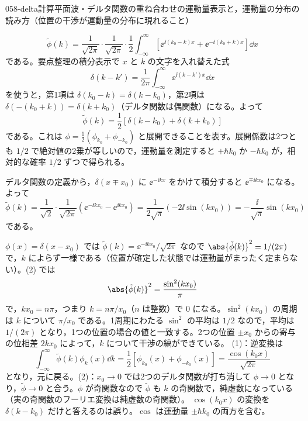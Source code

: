 \documentclass[uplatex,dvipdfmx,a4paper,11pt]{jsarticle}
\begin{document}
\begin{mondai}{058-delta}{計算}{平面波・デルタ関数の重ね合わせの運動量表示と，運動量の分布の読み方（位置の干渉が運動量の分布に現れること）}
\begin{tadashii}
\[ \tilde{\phi}(k)=\frac{1}{\sqrt{2\pi}}\cdot\frac{1}{\sqrt{2\pi}}\cdot\frac{1}{2}\int_{-\infty}^{\infty}\left[\ee^{\ii(k_{0}-k)x}+\ee^{-\ii(k_{0}+k)x}\right]\dd x \]
である。要点整理の積分表示で $x$ と $k$ の文字を入れ替えた式
\[ \delta(k-k')=\frac{1}{2\pi}\int_{-\infty}^{\infty}\ee^{\ii(k-k')x}\dd x \]
を使うと，第1項は $\delta(k_{0}-k)=\delta(k-k_{0})$，第2項は $\delta(-(k_{0}+k))=\delta(k+k_{0})$（デルタ関数は偶関数）になる。よって
\[ \tilde{\phi}(k)=\frac{1}{2}\left[\delta(k-k_{0})+\delta(k+k_{0})\right] \]
である。これは $\phi=\frac{1}{2}(\phi_{k_{0}}+\phi_{-k_{0}})$ と展開できることを表す。展開係数は2つとも $1/2$ で絶対値の2乗が等しいので，運動量を測定すると $+\hbar k_{0}$ か $-\hbar k_{0}$ が，相対的な確率 $1/2$ ずつで得られる。

 デルタ関数の定義から，$\delta(x\mp x_{0})$ に $\ee^{-\ii kx}$ をかけて積分すると $\ee^{\mp\ii kx_{0}}$ になる。よって
\[ \tilde{\phi}(k)=\frac{1}{\sqrt{2}}\cdot\frac{1}{\sqrt{2\pi}}\left(\ee^{-\ii kx_{0}}-\ee^{\ii kx_{0}}\right)=\frac{1}{2\sqrt{\pi}}\left(-2\ii\sin(kx_{0})\right)=-\frac{\ii}{\sqrt{\pi}}\sin(kx_{0}) \]
である。

 $\phi(x)=\delta(x-x_{0})$ では $\tilde{\phi}(k)=\ee^{-\ii kx_{0}}/\sqrt{2\pi}$ なので $\abs{\tilde{\phi}(k)}^{2}=1/(2\pi)$ で，$k$ によらず一様である（位置が確定した状態では運動量がまったく定まらない）。(2) では
\[ \abs{\tilde{\phi}(k)}^{2}=\frac{\sin^{2}(kx_{0})}{\pi} \]
で，$kx_{0}=n\pi$，つまり $k=n\pi/x_{0}$（$n$ は整数）で $0$ になる。$\sin^{2}(kx_{0})$ の周期は $k$ について $\pi/x_{0}$ である。1周期にわたる $\sin^{2}$ の平均は $1/2$ なので，平均は $1/(2\pi)$ となり，1つの位置の場合の値と一致する。2つの位置 $\pm x_{0}$ からの寄与の位相差 $2kx_{0}$ によって，$k$ について干渉の縞ができている。
\kenzan (1)：逆変換は
\[ \int_{-\infty}^{\infty}\tilde{\phi}(k)\phi_{k}(x)\dd k=\frac{1}{2}\left[\phi_{k_{0}}(x)+\phi_{-k_{0}}(x)\right]=\frac{\cos(k_{0}x)}{\sqrt{2\pi}} \]
となり，元に戻る。(2)：$x_{0}\to0$ では2つのデルタ関数が打ち消して $\phi\to0$ となり，$\tilde{\phi}\to0$ と合う。$\phi$ が奇関数なので $\tilde{\phi}$ も $k$ の奇関数で，純虚数になっている（実の奇関数のフーリエ変換は純虚数の奇関数）。
\tsumazuki $\cos(k_{0}x)$ の変換を $\delta(k-k_{0})$ だけと答えるのは誤り。$\cos$ は運動量 $\pm\hbar k_{0}$ の両方を含む。
\end{tadashii}
\end{mondai}
\end{document}
